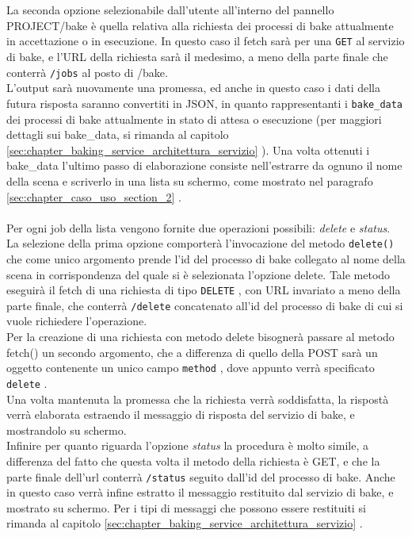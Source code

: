 \\
\\
La seconda opzione selezionabile dall’utente all’interno del pannello PROJECT/bake è quella relativa alla richiesta dei processi di bake attualmente in accettazione o in esecuzione.
In questo caso il fetch sarà per una \texttt{GET} al servizio di bake, e l’URL della richiesta sarà il medesimo, a meno della parte finale che conterrà \texttt{/jobs} al posto di /bake.
\\
L’output sarà nuovamente una promessa, ed anche in questo caso i dati della futura risposta saranno convertiti in JSON, in quanto rappresentanti i \texttt{bake\_data} dei processi di bake attualmente in stato di attesa o esecuzione (per maggiori dettagli sui bake\_data, si rimanda al capitolo \ref{sec:chapter_baking_service_architettura_servizio} ).
Una volta ottenuti i bake\_data l’ultimo passo di elaborazione consiste nell’estrarre da ognuno il nome della scena e scriverlo in una lista su schermo, come mostrato nel paragrafo \ref{sec:chapter_caso_uso_section_2} .
\\
\\
Per ogni job della lista vengono fornite due operazioni possibili: \emph{delete} e \emph{status}. 
\\
La selezione della prima opzione comporterà l’invocazione del metodo \texttt{delete()} che come unico argomento prende l’id del processo di bake collegato al nome della scena in corrispondenza del quale si è selezionata l’opzione delete. Tale metodo eseguirà il fetch di una richiesta di tipo \texttt{DELETE} , con URL invariato a meno della parte finale, che conterrà \texttt{/delete} concatenato all’id del processo di bake di cui si vuole richiedere l’operazione.
\\
Per la creazione di una richiesta con metodo delete bisognerà passare al metodo fetch() un secondo argomento, che a differenza di quello della POST sarà un oggetto contenente un unico campo \texttt{method} , dove appunto verrà specificato \texttt{delete} .
\\ 
Una volta mantenuta la promessa che la richiesta verrà soddisfatta, la rispostà verrà elaborata estraendo il messaggio di risposta del servizio di bake, e mostrandolo su schermo.
\\
Infinire per quanto riguarda l’opzione \emph{status} la procedura è molto simile, a differenza del fatto che questa volta il metodo della richiesta è GET, e che la parte finale dell’url conterrà \texttt{/status} seguito dall’id del processo di bake. Anche in questo caso verrà infine estratto il messaggio restituito dal servizio di bake, e mostrato su schermo. Per i tipi di messaggi che possono essere restituiti si rimanda al capitolo \ref{sec:chapter_baking_service_architettura_servizio} .

